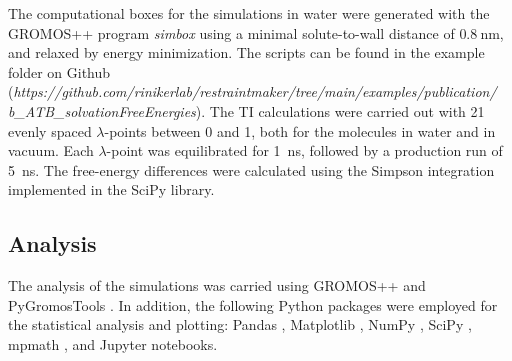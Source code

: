 The computational boxes for the simulations in water were generated with the GROMOS++ \cite{Eichenberger2011} program \textit{simbox} using a minimal solute-to-wall distance of $0.8~$nm, and relaxed by energy minimization. The scripts can be found in the example folder on Github (\textit{https://github.com/rinikerlab/restraintmaker/tree/main/examples/publication/\\b\_ATB\_solvationFreeEnergies}).
The TI calculations were carried out with 21 evenly spaced $\lambda$-points between 0 and 1, both for the molecules in water and in vacuum. Each $\lambda$-point was equilibrated for 1~ns, followed by a production run of 5~ns. The free-energy differences were calculated using the Simpson integration implemented in the SciPy library.\cite{Virtanen2020}

\subsection{Analysis}
The analysis of the simulations was carried using GROMOS++ \cite{Eichenberger2011} and PyGromosTools \cite{Lehner2021}. In addition, the following Python packages were employed for the statistical analysis and plotting: Pandas \cite{Mckinney2010}, Matplotlib \cite{Hunter2007}, NumPy \cite{Vanderwalt2011}, SciPy \cite{Virtanen2020}, mpmath \cite{Johansson2013}, and Jupyter notebooks.\cite{Kluyver2016}
